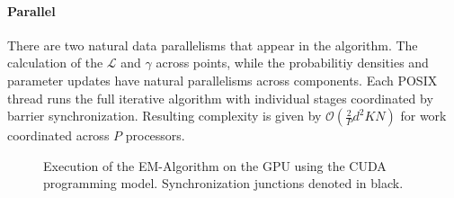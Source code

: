 \documentclass{article}
\begin{document}
\paragraph{Parallel} There are two natural data parallelisms that appear in the algorithm. The calculation of the $\mathcal{L}$ and $\gamma$ across points, while the probabilitiy densities and parameter updates have natural parallelisms across components. Each POSIX thread runs the full iterative algorithm with individual stages coordinated by barrier synchronization. Resulting complexity is given by $\mathcal{O}\left(\frac{2}{P} d^2 K N \right)$ for work coordinated across $P$ processors.


\begin{figure}[H]
	\caption{Execution of the EM-Algorithm on the GPU using the CUDA programming model. Synchronization junctions denoted in black.}
\end{figure}
\end{document}
